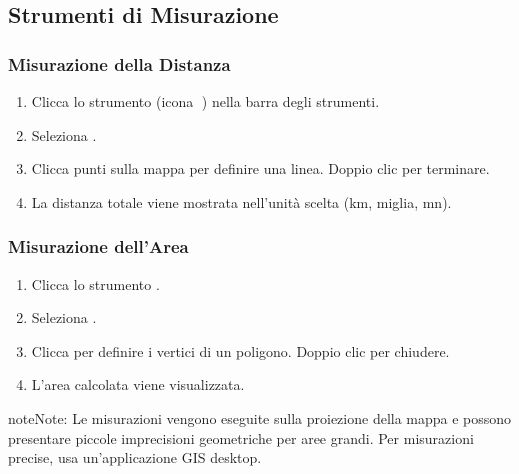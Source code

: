 \documentclass[letterpaper,10pt,english]{sphinxmanual}
\begin{document}
\subsection{Strumenti di Misurazione}
\label{\detokenize{it/04_esplorare_mappe:strumenti-di-misurazione}}

\subsubsection{Misurazione della Distanza}
\label{\detokenize{it/04_esplorare_mappe:misurazione-della-distanza}}\begin{enumerate}
%
\item {} 
\sphinxAtStartPar
Clicca lo strumento  (icona 📐) nella barra degli strumenti.

\item {} 
\sphinxAtStartPar
Seleziona .

\item {} 
\sphinxAtStartPar
Clicca punti sulla mappa per definire una linea. Doppio clic per terminare.

\item {} 
\sphinxAtStartPar
La distanza totale viene mostrata nell’unità scelta (km, miglia, mn).

\end{enumerate}


\subsubsection{Misurazione dell’Area}
\label{\detokenize{it/04_esplorare_mappe:misurazione-dell-area}}\begin{enumerate}
%
\item {} 
\sphinxAtStartPar
Clicca lo strumento .

\item {} 
\sphinxAtStartPar
Seleziona .

\item {} 
\sphinxAtStartPar
Clicca per definire i vertici di un poligono. Doppio clic per chiudere.

\item {} 
\sphinxAtStartPar
L’area calcolata viene visualizzata.

\end{enumerate}

\begin{sphinxadmonition}{note}{Note:}
\sphinxAtStartPar
Le misurazioni vengono eseguite sulla proiezione della mappa e possono presentare
piccole imprecisioni geometriche per aree grandi. Per misurazioni precise, usa
un’applicazione GIS desktop.
\end{sphinxadmonition}
\end{document}
